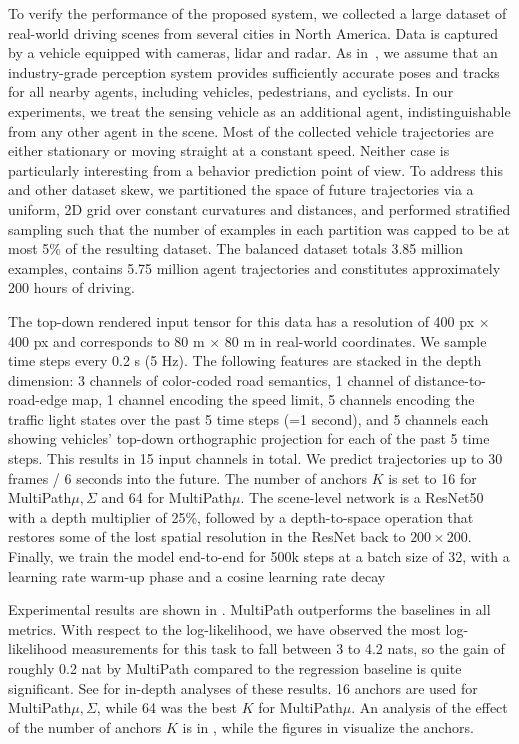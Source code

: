 \documentclass{article}
\newcommand{\multiflow}{MultiPath\xspace}
\newcommand{\supsecref}[1]{\secref{#1}}
\begin{document}
To verify the performance of the proposed system, we collected a large dataset of real-world driving scenes from several cities in North America. Data is captured by a vehicle equipped with cameras, lidar and radar. As in~\cite{Casas18,Hong19}, we assume that an industry-grade perception system provides sufficiently accurate poses and tracks for all nearby agents, including vehicles, pedestrians, and cyclists. In our experiments, we treat the sensing vehicle as an additional agent, indistinguishable from any other agent in the scene.
Most of the collected vehicle trajectories are either stationary or moving straight at a constant speed. Neither case is particularly interesting from a behavior prediction point of view.  To address this and other dataset skew, we partitioned the space of future trajectories via a uniform, 2D grid over constant curvatures and distances, and performed stratified sampling such that the number of examples in each partition was capped to be at most 5\% of the resulting dataset. The balanced dataset totals 3.85 million examples, contains 5.75 million agent trajectories and constitutes approximately 200 hours of driving.

The top-down rendered input tensor for this data has a resolution of 400 px $\times$ 400 px and corresponds to 80 m $\times$ 80 m in real-world coordinates. We sample time steps every 0.2 s (5 Hz). The following features are stacked in the depth dimension: 3 channels of color-coded road semantics, 1 channel of distance-to-road-edge map, 1 channel encoding the speed limit, 5 channels encoding the traffic light states over the past 5 time steps (=1 second), and 5 channels each showing vehicles' top-down orthographic projection for each of the past 5 time steps. This results in 15 input channels in total. We predict trajectories up to 30 frames / 6 seconds into the future. The number of anchors $K$ is set to 16 for \multiflow $\mu, \Sigma$ and 64 for \multiflow $\mu$. The scene-level network is a ResNet50 \cite{He16} with a depth multiplier of 25\%, followed by a depth-to-space operation that restores some of the lost spatial resolution in the ResNet back to $200\times200$. Finally, we train the model end-to-end for 500k steps at a batch size of 32, with a learning rate warm-up phase and a cosine learning rate decay 

Experimental results are shown in . \multiflow outperforms the baselines in all metrics. With respect to the log-likelihood, we have observed the most log-likelihood measurements for this task to fall between 3 to 4.2 nats, so the gain of roughly 0.2 nat by \multiflow compared to the regression baseline is quite significant. See \supsecref{sec:analysis} for in-depth analyses of these results. 16 anchors are used for \multiflow $\mu, \Sigma$, while 64 was the best $K$ for \multiflow $\mu$. An analysis of the effect of the number of anchors $K$ is in \supsecref{sec:anchors}, while the figures in \supsecref{sec:viz_clusters} visualize the anchors.
\end{document}
